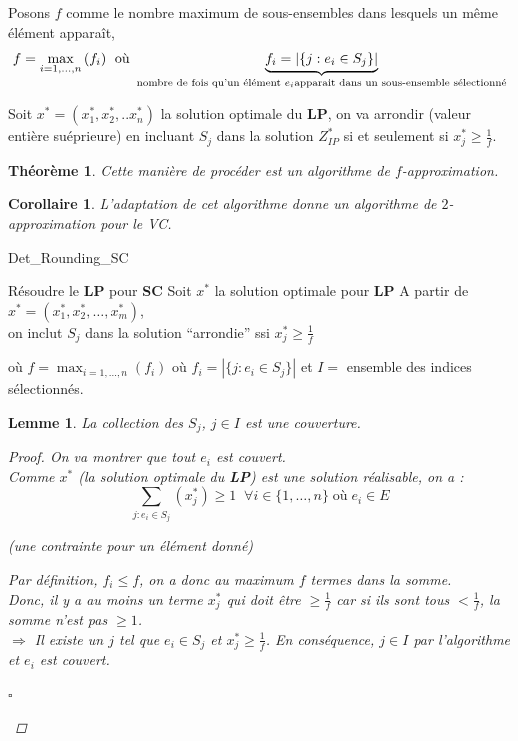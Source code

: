 \documentclass[12pt]{article}
\newcommand{\titre}[1]{\textcolor{title}{#1}}
\newcommand{\cqfd}{\begin{flushright}$\square$\end{flushright}}
\newtheorem{corollaire}{Corollaire}[section]
\newtheorem{thm}{Th\'eor\`eme}[section]
\newtheorem{lemme}{Lemme}[section]
\newtheorem{proof}{Preuve}[section]
\begin{document}
Posons $f$ comme le nombre maximum de sous-ensembles dans lesquels un même élément apparaît,
$$f = \max_{i=1,\ldots,n}{(f_i)} \; \text{ où } \underbrace{f_i = \left| \{j : e_i \in S_j \}
\right|}_{\text{nombre de fois qu'un élément $e_i$ \\ apparait dans un sous-ensemble sélectionné}}$$

Soit $x^* = (x_1^*, x_2^*, .. x_n^*)$ la solution optimale du \textbf{LP},
on va arrondir (valeur entière suéprieure) en incluant $S_j$ dans la solution $Z^*_{IP}$ si et seulement si
$x_j^* \geq \frac{1}{f}$.

\begin{thm}
Cette manière de procéder est un algorithme de $f$-\textit{approximation}.
\end{thm}
\begin{corollaire}
L'adaptation de cet algorithme donne un algorithme de $2$-approximation pour le
\titre{VC}.
\end{corollaire}

\begin{algorithm}[H]
\caption{Det\_Rounding\_SC}
\begin{algorithmic}[1]
\STATE Résoudre le \textbf{LP} pour \textbf{\titre{SC}}
\STATE Soit $x^*$ la solution optimale pour \textbf{LP}
\STATE A partir de $x^* = (x^*_1,x^*_2, \ldots, x^*_m)$,\\
on inclut $S_j$ dans la solution ``arrondie'' ssi $x^*_j \geq \frac{1}{f}$
\end{algorithmic}
\end{algorithm}

où $f = \max_{i=1,...,n} (f_i)$ où $f_i = |\{j:e_i \in S_j\}|$ et $I =$ ensemble
des indices sélectionnés.

\begin{lemme}
La collection des $S_j$, $j \in I$ est une couverture.
\begin{proof}
On va montrer que tout $e_i$ est couvert.\\
Comme $x^*$ \textit{(la solution optimale du \textbf{LP})} est une solution
réalisable, on a :
$$\sum_{j : e_i\in S_j} (x^*_j) \geq 1 \; \; \forall i \in \{1, \dots, n \} \;
\text{où} \; e_i \in E$$
\begin{center}\textit{(une contrainte pour un élément donné)}\end{center}
Par définition, $f_i \leq f$, on a donc au maximum $f$ termes dans la somme. \\
Donc, il y a au moins un terme $x^*_j$ qui doit être $\geq \frac{1}{f}$ car si
ils sont tous $<\frac{1}{f}$, la somme n'est pas $\geq 1$.\\
$\Rightarrow$ Il existe un $j$ tel que $e_i \in S_j$ et $x^*_j \geq \frac{1}{f}$.
En conséquence, $j \in I$ par l'algorithme et $e_i$ est couvert.
\cqfd
\end{proof}
\end{lemme}
\end{document}
